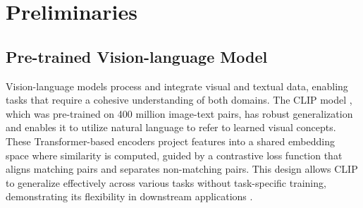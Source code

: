 
\section{Preliminaries}
\label{sec:preliminaries}

\subsection{Pre-trained Vision-language Model}

Vision-language models process and integrate visual and textual data, enabling tasks that require a cohesive understanding of both domains. The CLIP model \cite{radford2021learning}, which was pre-trained on 400 million image-text pairs, has robust generalization and enables it to utilize natural language to refer to learned visual concepts. These Transformer-based encoders \cite{DNN-2017NeurIPS-Attention} project features into a shared embedding space where similarity is computed, guided by a contrastive loss function that aligns matching pairs and separates non-matching pairs. This design allows CLIP to generalize effectively across various tasks without task-specific training, demonstrating its flexibility in downstream applications \cite{luddecke2022image, zhou2022maskclip, Zhou_Zhang_Lei_Liu_Liu_2022, Chen_Si_Zhang_Wang_Wang_Tan_2023}.

